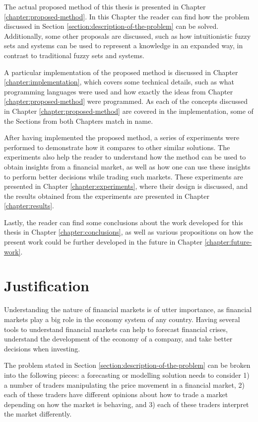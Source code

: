 The actual proposed method of this thesis is presented in Chapter
\ref{chapter:proposed-method}. In this Chapter the reader can find how the
problem discussed in Section \ref{section:description-of-the-problem} can be
solved. Additionally, some other proposals are discussed, such as how
intuitionistic fuzzy sets and systems can be used to represent a knowledge in an
expanded way, in contrast to traditional fuzzy sets and systems.

A particular implementation of the proposed method is discussed in Chapter
\ref{chapter:implementation}, which covers some technical details, such as what
programming languages were used and how exactly the ideas from Chapter
\ref{chapter:proposed-method} were programmed. As each of the concepts discussed
in Chapter \ref{chapter:proposed-method} are covered in the implementation, some
of the Sections from both Chapters match in name.

After having implemented the proposed method, a series of experiments were
performed to demonstrate how it compares to other similar solutions. The
experiments also help the reader to understand how the method can be used to
obtain insights from a financial market, as well as how one can use these
insights to perform better decisions while trading such markets. These %
experiments are presented in Chapter \ref{chapter:experiments}, where their
design is discussed, and the results obtained from the experiments are presented
in Chapter \ref{chapter:results}.

Lastly, the reader can find some conclusions about the work developed for this
thesis in Chapter \ref{chapter:conclusions}, as well as various propositions on
how the present work could be further developed in the future in Chapter
\ref{chapter:future-work}.

\section{Justification}
\label{section:justification}

Understanding the nature of financial markets is of utter importance, as
financial markets play a big role in the economy system of any country. Having
several tools to understand financial markets can help to forecast financial
crises, understand the development of the economy of a company, and take better
decisions when investing.

The problem stated in Section \ref{section:description-of-the-problem} can be
broken into the following pieces: a forecasting or modelling solution needs to
consider 1) a number of traders manipulating the price movement in a financial
market, 2) each of these traders have different opinions about how to trade a
market depending on how the market is behaving, and 3) each of these traders
interpret the market differently.

